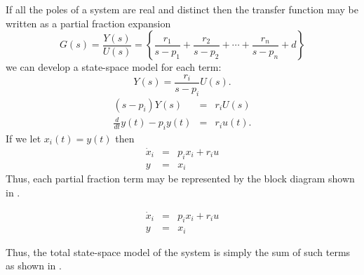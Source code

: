 If all the poles of a system are real and distinct then the
transfer function may be written as a partial fraction expansion
\[ G(s) = \frac{Y(s)}{U(s)} = \left\{\frac{r_1}{s-p_1} +
\frac{r_2}{s-p_2} + \cdots + \frac{r_n}{s-p_n} + d\right\}
\]
we can develop a state-space model for each term:
\[Y(s)=\frac{r_i}{s-p_i}U(s).\]
\begin{eqnarray*}
(s-p_i)Y(s) & = & r_i U(s)\\ \frac{d}{dt}y(t)-p_i y(t) &=& r_i
u(t).\end{eqnarray*} If we let $x_i(t) = y(t)$ then
\begin{eqnarray*}
\dot{x}_i &=& p_i x_i + r_i u \\ y &=& x_i
\end{eqnarray*}
Thus, each partial fraction term may be represented by the block
diagram shown in .
\begin{slide}\label{slide:l6s1}
\begin{eqnarray*}
\dot{x}_i &=& p_i x_i + r_i u \\ y &=& x_i
\end{eqnarray*}
\end{slide}
Thus, the total state-space model of the system is simply the sum
of such terms as shown in .
\begin{slide}\label{slide:l6s2}
\end{slide}

